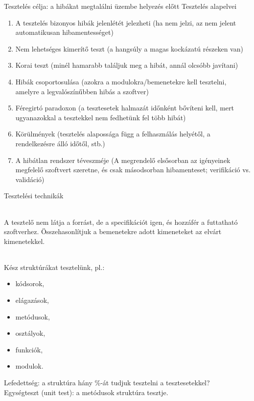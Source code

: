 \begin{frame}
  Tesztelés célja: a hibákat megtalálni üzembe helyezés előtt
  \vfill
  Tesztelés alapelvei
  \begin{enumerate}
    \item A tesztelés bizonyos hibák jelenlétét jelezheti (ha nem jelzi, az nem jelent automatikusan hibamentességet)
    \item Nem lehetséges kimerítő teszt (a hangsúly a magas kockázatú részeken van)
    \item Korai teszt (minél hamarabb találjuk meg a hibát, annál olcsóbb javítani)
    \item Hibák csoportosulása (azokra a modulokra/bemenetekre kell tesztelni, amelyre a legvalószínűbben hibás a szoftver)
    \item Féregirtó paradoxon (a tesztesetek halmazát időnként bővíteni kell, mert ugyanazokkal a tesztekkel nem fedhetünk fel 
    több hibát)
    \item Körülmények (tesztelés alapossága függ a felhasználás helyétől, a rendelkezésre álló időtől, stb.)
    \item A hibátlan rendszer téveszméje (A megrendelő elsősorban az igényeinek megfelelő szoftvert szeretne, és csak 
    másodsorban hibamenteset; verifikáció vs. validáció)
  \end{enumerate}
\end{frame}

\begin{frame}
  Tesztelési technikák
  \begin{description}[mm]
    \item[Fekete dobozos (black-box, specifikáció alapú)] \hfill\\ A tesztelő nem látja a forrást, de a specifikációt igen, és 
hozzáfér a futtatható szoftverhez. Összehasonlítjuk a bemenetekre adott kimeneteket az elvárt kimenetekkel.
    \item[Fehér dobozos (white-box, strukturális teszt)] \hfill\\ Kész struktúrákat tesztelünk, pl.:
    \begin{itemize}
      \item kódsorok,
      \item elágazások,
      \item metódusok,
      \item osztályok,
      \item funkciók,
      \item modulok.
    \end{itemize}
    Lefedettség: a struktúra hány \%-át tudjuk tesztelni a tesztesetekkel?\\
    Egységteszt (unit test): a metódusok struktúra tesztje.
  \end{description}
\end{frame}

